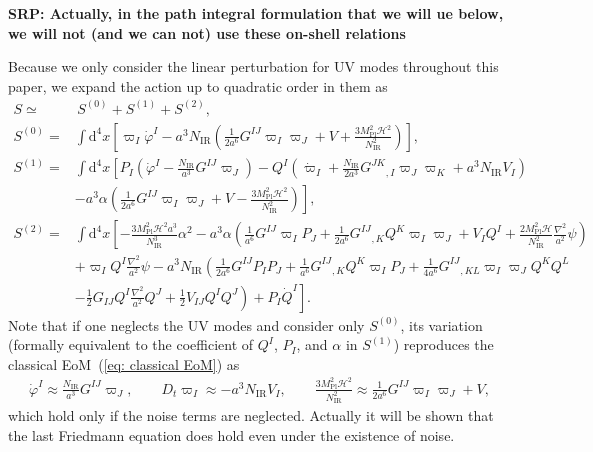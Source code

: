 \documentclass[a4paper,11pt]{article}
\newcommand{\dd}{\mathrm{d}}
\newcommand{\Mpl}{M_\text{Pl}}
\newcommand{\IR}{\text{IR}}
\newcommand{\calH}{\mathcal{H}}
\newcommand{\bae}[1]{\begin{align} #1 \end{align}}
\begin{document}
{\bf SRP: Actually, in the path integral formulation that we will ue below, we will not (and we can not) use these on-shell relations}

Because we only consider the linear perturbation for UV modes throughout this paper, we expand the action
up to quadratic order in them as
\bae{
	S\simeq&\,S^{(0)}+S^{(1)}+S^{(2)}, \\
	S^{(0)}=&\int\dd^4x\left[\varpi_I\dot{\varphi}^I-a^3N_\IR\left(\frac{1}{2a^6}G^{IJ}\varpi_I\varpi_J+V+\frac{3\Mpl^2\calH^2}{N_\IR^2}\right)\right], \label{eq: S0} \\
	S^{(1)}=&\int\dd^4x\left[P_I\left(\dot{\varphi}^I-\frac{N_\IR}{a^3}G^{IJ}\varpi_J\right)
	-Q^I\left(\dot{\varpi}_I+\frac{N_\IR}{2a^3}G^{JK}{}_{,I}\varpi_J\varpi_K+a^3N_\IR V_I\right) \right. \nonumber \\
	&\left.-a^3\alpha\left(\frac{1}{2a^6}G^{IJ}\varpi_I\varpi_J+V-\frac{3\Mpl^2\calH^2}{N_\IR^2}\right)\right], \label{eq: S1} \\
	S^{(2)}=&\int\dd^4x\left[-\frac{3\Mpl^2\calH^2a^3}{N_\IR^3}\alpha^2
	-a^3\alpha\left(\frac{1}{a^6}G^{IJ}\varpi_IP_J+\frac{1}{2a^6}G^{IJ}{}_{,K}Q^K\varpi_I\varpi_J+V_IQ^I
	+\frac{2\Mpl^2\calH}{N_\IR^2}\frac{\nabla^2}{a^2}\psi\right) \right. \nonumber \\
	&\left. +\varpi_IQ^I\frac{\nabla^2}{a^2}\psi-a^3N_\IR\left(\frac{1}{2a^6}G^{IJ}P_IP_J+\frac{1}{a^6}G^{IJ}{}_{,K}Q^K\varpi_IP_J
	+\frac{1}{4a^6}G^{IJ}{}_{,KL}\varpi_I\varpi_JQ^KQ^L \right.\right. \nonumber \\
	&\left.\left. -\frac{1}{2}G_{IJ}Q^I\frac{\nabla^2}{a^2}Q^J+\frac{1}{2}V_{IJ}Q^IQ^J\right)+P_I\dot{Q}^I\right]. \label{eq: S2}
}
Note that if one neglects the UV modes and consider only $S^{(0)}$, its variation (formally equivalent to the coefficient of $Q^I$, $P_I$, and $\alpha$
in $S^{(1)}$) reproduces the classical EoM~(\ref{eq: classical EoM}) as
\bae{\label{eq: classical IR EoM}
	\dot{\varphi}^I\approx\frac{N_\IR}{a^3}G^{IJ}\varpi_J, \quad\quad
	D_t\varpi_I\approx-a^3N_\IR V_I, \quad\quad
	\frac{3\Mpl^2\calH^2}{N_\IR^2}\approx\frac{1}{2a^6}G^{IJ}\varpi_I\varpi_J+V,
}
which hold only if the noise terms are neglected. Actually it will be shown that the last Friedmann equation does hold even under the existence 
of noise.
\end{document}
